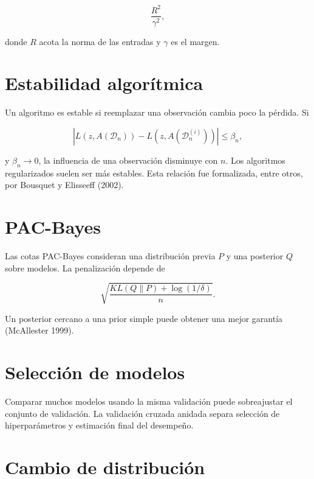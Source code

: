 \documentclass[
  spanish,
  10.5pt,
  letterpaper,
  DIV=11,
  numbers=noendperiod,
  oneside,
  open=any]{scrreprt}
\theoremstyle{definition}
\theoremstyle{definition}
\theoremstyle{plain}
\theoremstyle{remark}
\begin{document}
\[
\frac{R^2}{\gamma^2},
\]

donde \(R\) acota la norma de las entradas y \(\gamma\) es el margen.

\section*{Estabilidad algorítmica}\label{estabilidad-algoruxedtmica}


Un algoritmo es estable si reemplazar una observación cambia poco la
pérdida. Si

\[
|L(z,A(\mathcal D_n))-L(z,A(\mathcal D_n^{(i)}))|\le\beta_n,
\]

y \(\beta_n\to0\), la influencia de una observación disminuye con \(n\).
Los algoritmos regularizados suelen ser más estables. Esta relación fue
formalizada, entre otros, por Bousquet y Elisseeff (2002).

\section*{PAC-Bayes}\label{pac-bayes}


Las cotas PAC-Bayes consideran una distribución previa \(P\) y una
posterior \(Q\) sobre modelos. La penalización depende de

\[
\sqrt{\frac{KL(Q\|P)+\log(1/\delta)}{n}}.
\]

Un posterior cercano a una prior simple puede obtener una mejor garantía
(McAllester 1999).

\section*{Selección de modelos}\label{selecciuxf3n-de-modelos-1}


Comparar muchos modelos usando la misma validación puede sobreajustar el
conjunto de validación. La validación cruzada anidada separa selección
de hiperparámetros y estimación final del desempeño.

\section*{Cambio de distribución}\label{cambio-de-distribuciuxf3n}
\end{document}
